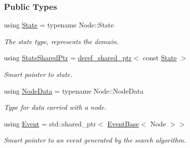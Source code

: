 \subsubsection*{Public Types}
\begin{DoxyCompactItemize}
\item 
using \hyperlink{structslb_1_1core_1_1ui_1_1EventBase_a2fe332d7f0fa68fe45a0b2e31c6790d1}{State} = typename Node\+::\+State\hypertarget{structslb_1_1core_1_1ui_1_1EventBase_a2fe332d7f0fa68fe45a0b2e31c6790d1}{}\label{structslb_1_1core_1_1ui_1_1EventBase_a2fe332d7f0fa68fe45a0b2e31c6790d1}

\begin{DoxyCompactList}\small\item\em The state type, represents the domain. \end{DoxyCompactList}\item 
using \hyperlink{structslb_1_1core_1_1ui_1_1EventBase_a50419d00607aad434bb97138eabe2c94}{State\+Shared\+Ptr} = \hyperlink{classslb_1_1core_1_1util_1_1deref__shared__ptr}{deref\+\_\+shared\+\_\+ptr}$<$ const \hyperlink{structslb_1_1core_1_1ui_1_1EventBase_a2fe332d7f0fa68fe45a0b2e31c6790d1}{State} $>$\hypertarget{structslb_1_1core_1_1ui_1_1EventBase_a50419d00607aad434bb97138eabe2c94}{}\label{structslb_1_1core_1_1ui_1_1EventBase_a50419d00607aad434bb97138eabe2c94}

\begin{DoxyCompactList}\small\item\em Smart pointer to state. \end{DoxyCompactList}\item 
using \hyperlink{structslb_1_1core_1_1ui_1_1EventBase_a1eefdf6331e2af79cd1ba37eff880a18}{Node\+Data} = typename Node\+::\+Node\+Data\hypertarget{structslb_1_1core_1_1ui_1_1EventBase_a1eefdf6331e2af79cd1ba37eff880a18}{}\label{structslb_1_1core_1_1ui_1_1EventBase_a1eefdf6331e2af79cd1ba37eff880a18}

\begin{DoxyCompactList}\small\item\em Type for data carried with a node. \end{DoxyCompactList}\item 
using \hyperlink{structslb_1_1core_1_1ui_1_1EventBase_a7b61ed0ba0f2fdeb854c631188725d37}{Event} = std\+::shared\+\_\+ptr$<$ \hyperlink{structslb_1_1core_1_1ui_1_1EventBase}{Event\+Base}$<$ Node $>$$>$\hypertarget{structslb_1_1core_1_1ui_1_1EventBase_a7b61ed0ba0f2fdeb854c631188725d37}{}\label{structslb_1_1core_1_1ui_1_1EventBase_a7b61ed0ba0f2fdeb854c631188725d37}

\begin{DoxyCompactList}\small\item\em Smart pointer to an event generated by the search algorithm. \end{DoxyCompactList}\end{DoxyCompactItemize}
